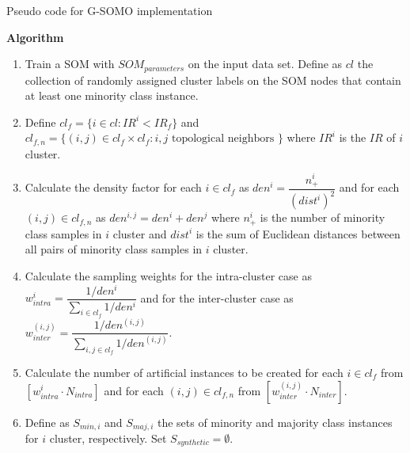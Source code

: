 \documentclass[parskip=full]{scrartcl}
\begin{document}
\begin{algorithm}[H]

	\SetAlgoLined
	\caption{Pseudo code for G-SOMO implementation}
	
	\BlankLine
	
	

	\BlankLine

	\textbf{Algorithm}
	\SetAlgoLined

	\begin{enumerate}

		\item Train a SOM with $SOM_{parameters}$ on the input data set. Define
			  as $cl$ the collection of randomly assigned cluster labels on the
			  SOM nodes that contain at least one minority class instance.
	
		\item Define $cl_{f} =\{i \in cl: IR^{i} < IR_{f} \} $ and 	
			  $cl_{f, n} =\{(i, j) \in cl_{f} \times cl_{f}: i, j \text{ topological neighbors } \} $ 
			  where $IR^{i}$ is the $IR$ of  $i$ cluster.
	
		\item Calculate the density factor for each $i \in cl_{f}$  as $den^{i}
			  = \dfrac{n^{i}_{+}}{(dist^{i})^2}$ and for each $(i, j) \in cl_{f, n}$ 
			  as $den^{i, j} = den^{i} + den^{j}$ where $n^{i}_{+}$ is the
			  number of minority class samples in $i$ cluster and $dist^{i}$ is
			  the sum of Euclidean distances between all pairs  of minority
			  class samples in $i$ cluster.
	
		\item Calculate the sampling weights for the intra-cluster case as
			  $w^{i}_{intra} = \dfrac{1 / den^{i}}{\sum_{i \in cl_{f}} 1/den^{i}}$ and
			  for the inter-cluster case as 
			  $w^{(i, j)}_{inter} = \dfrac{1 / den^{(i, j)}}{\sum_{i,j \in cl_{f}} 1/den^{(i,j)}}$.
	
		\item Calculate the number of artificial instances to be created for
			  each $i \in cl_{f}$ from $[w^{i}_{intra} \cdot N_{intra}]$ and for
			  each $(i, j) \in cl_{f, n}$ from $[w^{(i, j)}_{inter} \cdot N_{inter}]$.

		\item Define as $S_{min, i}$ and $S_{maj, i}$ the sets of minority and
			  majority class instances for $i$ cluster, respectively. 
			  Set $S_{synthetic} = \emptyset$.
	

\end{enumerate}
\end{algorithm}
\end{document}
